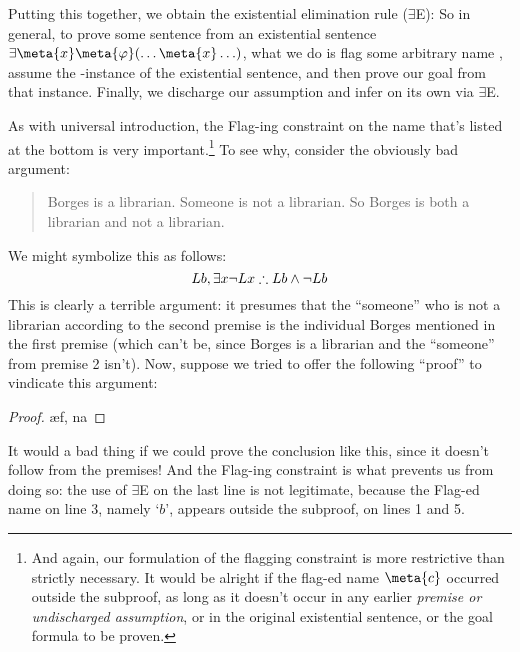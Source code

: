 Putting this together, we obtain the existential elimination rule ($\exists$E):
So in general, to prove some sentence \meta{\psi} from an existential sentence $\exists \meta{x}\meta{\varphi}(\ldots \meta{x} \ldots)$, what we do is flag some arbitrary name , assume the -instance of the existential sentence, and then prove our goal \meta{\psi} from that instance.  Finally, we discharge our assumption and infer \meta{\psi} on its own via $\exists$E.

As with universal introduction, the Flag-ing constraint on the name  that's listed at the bottom is very important.\footnote{And again, our formulation of the flagging constraint is more restrictive than strictly necessary.  It would be alright if the flag-ed name $\meta{c}$ occurred outside the subproof, as long as it doesn't occur in any earlier \emph{premise or undischarged assumption}, or in the original existential sentence, or the goal formula to be proven.}
To see why, consider the obviously bad argument:
	\begin{quote}
		Borges is a librarian. Someone is not a librarian. So Borges is both a librarian and not a librarian. 	\end{quote}
We might symbolize this as follows:
$$Lb, \exists x \neg Lx \therefore Lb \wedge \neg Lb$$
This is clearly a terrible argument: it presumes that the ``someone'' who is not a librarian according to the second premise is the individual Borges mentioned in the first premise (which can't be, since Borges is a librarian and the ``someone'' from premise 2 isn't).  Now, suppose we tried to offer the following ``proof'' to vindicate this argument:
\begin{proof}
	 
	 
	\open
		 
		\ae{f, na}
	\close
\end{proof}
It would a bad thing if we could prove the conclusion like this, since it doesn't follow from the premises!  And the Flag-ing constraint is what prevents us from doing so:  the use of $\exists$E on the last line is not legitimate, because the Flag-ed name on line 3, namely `$b$', appears outside the subproof, on lines 1 and 5.



